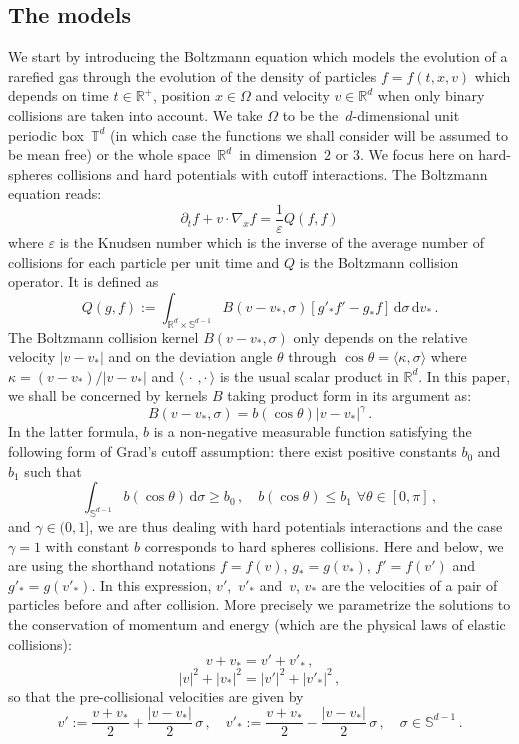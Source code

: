 \documentclass[11pt]{article}
\theoremstyle{definition}
\numberwithin{equation}{section}
\numberwithin{figure}{section}
\numberwithin{table}{section}
\newcommand*{\dd}{\mathrm{d}}
\newcommand*{\dv}{\dd v}
\newcommand*{\dsigma}{\dd \sigma}
\newcommand*\R {\mathbb{R}}
\newcommand*\Sp {\mathbb{S}}
\newcommand*\eps{{\varepsilon}}
\let\oldforall\forall
\renewcommand*{\forall}{\mathrel{\oldforall}}
\begin{document}
\subsection{The models}
We start by introducing the Boltzmann equation which models the evolution of a rarefied gas through the evolution of the density of particles $f=f(t,x,v)$ which depends on time $t \in \R^+$, position $x \in \Omega$ and velocity $v \in \R^d$ when only binary collisions are taken into account. We take $\Omega $ to be the~$d$-dimensional unit periodic box~${\mathbb T}^d$ (in which case the functions we shall consider will be assumed to be mean free) or the whole space~$ \R^d$~in dimension~$2$ or $3$. We focus here on hard-spheres collisions and hard potentials with cutoff interactions. The Boltzmann equation reads:
\[
\partial_t f + v \cdot \nabla_x f = \frac{1}{\eps} Q(f,f)
\]
where $\eps$ is the Knudsen number which is the inverse of the average number of collisions for each particle per unit time and $Q$ is the Boltzmann collision operator. It is defined as
\[
Q(g,f):=\int_{\R^d \times \Sp^{d-1}} B(v-v_*,\sigma) \left[g'_*f' - g_* f \right] \, \dsigma \, \dv_* \,.
\]
The Boltzmann collision kernel $B(v-v_*,\sigma)$ only depends on the relative velocity $|v-v_*|$ and on the deviation angle $\theta$ through $\cos \theta = \langle \kappa, \sigma \rangle$ where $\kappa = (v-v_*)/|v-v_*|$ and $\langle {\,\cdot\,, \cdot\,} \rangle$ is the usual scalar product in $\R^d$. In this paper, we shall be concerned by kernels $B$ taking product form in its argument as:
\[
B(v-v_*,\sigma) = b(\cos \theta) |v-v_*|^\gamma \,.
\]
In the latter formula, $b$ is a non-negative measurable function satisfying the following form of Grad's cutoff assumption: there exist positive constants $b_0$ and $b_1$ such that
\[
\int_{\Sp^{d-1}} b(\cos \theta) \, \dsigma \ge b_0\,, \quad b(\cos \theta) \le b_1 \, \, \forall \theta \in [0,\pi] \,,
\]
and $\gamma \in (0,1]$, we are thus dealing with hard potentials interactions and the case~$\gamma =1$ with constant $b$ corresponds to hard spheres collisions. Here and below, we are using the shorthand notations $f=f(v)$, $g_*=g(v_*)$, $f'=f(v')$ and $g'_*=g(v'_*)$. In this expression, $v'$,~$v'_*$ and~$v$, $v_*$ are the velocities of a pair of particles before and after collision. More precisely we parametrize the solutions to the conservation of momentum and energy (which are the physical laws of elastic collisions):
\[
v+v_*=v'+v'_* \,,
\]
\[
|v|^2+|v_*|^2=|v'|^2+ |v'_*|^2\,,
\]
so that the pre-collisional velocities are given by
\[
v':=\frac{v+v_*}{2} + \frac{|v-v_*|}{2}\, \sigma \,, \quad v'_*:=\frac{v+v_*}{2} - \frac{|v-v_*|}{2}\, \sigma\,, \quad \sigma \in \Sp^{d-1} \,.
\]
\end{document}
